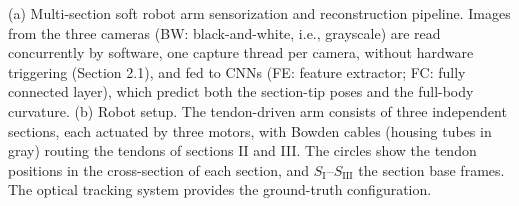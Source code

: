 \caption{(a) Multi-section soft robot arm sensorization and reconstruction pipeline. Images from the three cameras (BW: black-and-white, i.e., grayscale) are read concurrently by software, one capture thread per camera, without hardware triggering (Section 2.1), and fed to CNNs (FE: feature extractor; FC: fully connected layer), which predict both the section-tip poses and the full-body curvature. (b) Robot setup. The tendon-driven arm consists of three independent sections, each actuated by three motors, with Bowden cables (housing tubes in gray) routing the tendons of sections II and III. The circles show the tendon positions in the cross-section of each section, and $S_{\mathrm{I}}$--$S_{\mathrm{III}}$ the section base frames. The optical tracking system provides the ground-truth configuration.}
